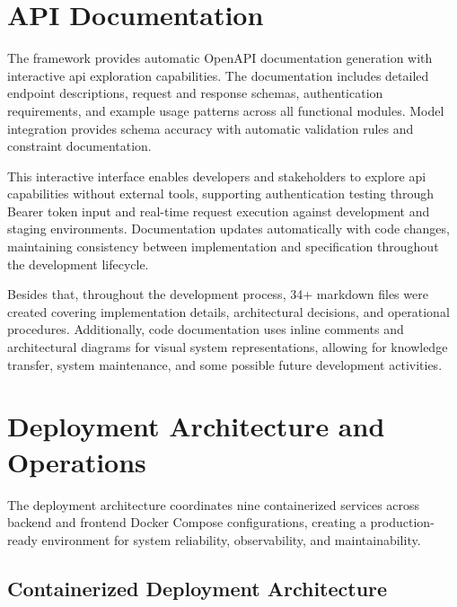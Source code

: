


\section{API Documentation} \label{section:api_documentation}

The framework provides automatic OpenAPI documentation generation with interactive \ac{api} exploration capabilities. The documentation includes detailed endpoint descriptions, request and response schemas, authentication requirements, and example usage patterns across all functional modules. Model integration provides schema accuracy with automatic validation rules and constraint documentation.

This interactive interface enables developers and stakeholders to explore \ac{api} capabilities without external tools, supporting authentication testing through Bearer token input and real-time request execution against development and staging environments. Documentation updates automatically with code changes, maintaining consistency between implementation and specification throughout the development lifecycle.

Besides that, throughout the development process, 34+ markdown files were created covering implementation details, architectural decisions, and operational procedures. Additionally, code documentation uses inline comments and architectural diagrams for visual system representations, allowing for knowledge transfer, system maintenance, and some possible future development activities.


\section{Deployment Architecture and Operations} \label{section:deployment_operations}

The deployment architecture coordinates nine containerized services across backend and frontend Docker Compose configurations, creating a production-ready environment for system reliability, observability, and maintainability.

\subsection{Containerized Deployment Architecture} \label{subsection:container_deployment}

